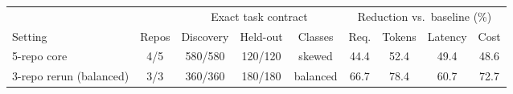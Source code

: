 \begin{tabular}{@{}lcccccccc@{}}
\toprule
& & \multicolumn{3}{c}{Exact task contract} & \multicolumn{4}{c}{Reduction vs.\ baseline (\%)} \\
\cmidrule(lr){3-5}\cmidrule(lr){6-9}
Setting & Repos & Discovery & Held-out & Classes & Req. & Tokens & Latency & Cost \\
\midrule
5-repo core             & 4/5 & 580/580 & 120/120 & skewed   & 44.4 & 52.4 & 49.4 & 48.6 \\
3-repo rerun (balanced) & 3/3 & 360/360 & 180/180 & balanced & 66.7 & 78.4 & 60.7 & 72.7 \\
\bottomrule
\end{tabular}
